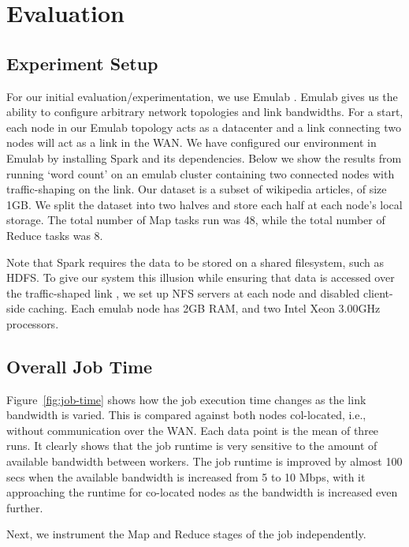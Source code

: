 \section{Evaluation}

\subsection{Experiment Setup}
For our initial evaluation/experimentation, we use Emulab \cite{2}. Emulab gives us the ability to configure arbitrary network topologies and link bandwidths. For a start, each node in our Emulab topology acts as a datacenter and a link connecting two nodes will act as a link in the WAN. We have configured our environment in Emulab by installing Spark and its dependencies.  Below we show the results from running `word count' on an emulab cluster containing two connected nodes with traffic-shaping on the link. Our dataset is a subset of wikipedia articles, of size 1GB. We split the dataset into two halves and store each half at each node's local storage. The total number of Map tasks run was 48, while the total number of Reduce tasks was 8. 

Note that Spark requires the data to be stored on a shared filesystem, such as HDFS. To give our system this illusion while ensuring that data is accessed over the traffic-shaped link , we set up NFS servers at each node and disabled client-side caching. Each emulab node has 2GB RAM, and two Intel Xeon 3.00GHz processors.

\subsection{Overall Job Time}
Figure~\ref{fig:job-time} shows how the job execution time changes as the link bandwidth is varied. This is compared against both nodes col-located, i.e., without communication over the WAN. Each data point is the mean of three runs. It clearly shows that the job runtime is very sensitive to the amount of available bandwidth between workers. The job runtime is improved by almost 100 secs when the available bandwidth is increased from 5 to 10 Mbps, with it approaching the runtime for co-located nodes as the bandwidth is increased even further.  

Next, we instrument the Map and Reduce stages of the job independently.

